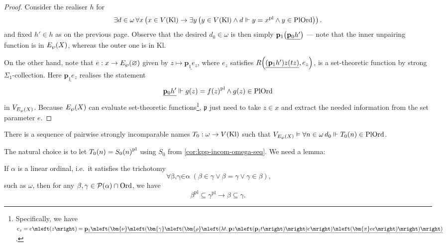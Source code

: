 \documentclass[12pt,openany]{book}
\theoremstyle{plain}
\theoremstyle{definition}
\newcommand\opA[1]{\mathop{\forall #1}}
\newcommand\opE[1]{\mathop{\exists #1}}
\newcommand\oplam[1]{\mathop{\lambda #1.}}
\newcommand\Pow{\mathcal{P}}
\newcommand\IKPP{\mathrm{IKP}\mleft(\Pow\mright)}
\newcommand\Ord{\mathrm{Ord}}
\newcommand\PlOrd{\mathrm{PlOrd}}
\newcommand\Kl{\mathrm{Kl}}
\newcommand\bp{\mathbf{p}}
\newcommand\pl{\mathrm{pl}}
\begin{document}
\begin{proof}
  Consider the realiser $h$ for
  \[\opE{d \in \omega} \opA{x} \left(x \in V\mleft(\Kl\mright) \rightarrow \opE{y} \left(y \in V\mleft(\Kl\mright) \land d \Vdash y = x^\pl \land y \in \PlOrd\right)\right).\]
  and fixed $h' \in h$ as on the previous page. Observe that the desired $d_0 \in \omega$ is then simply $\bp_1 \mleft(\underline{\bp_0 h'}\mright)$ --- note that the inner unpairing function is in $E_\wp\mleft(X\mright)$, whereas the outer one is in $\Kl$.

  On the other hand, note that $e : x \rightarrow E_\wp\mleft(\varnothing\mright)$ given by $z \mapsto \underline{\bp_1 e_z}$, where $e_z$ satisfies $R\mleft(\underline{\mleft(\bp_1 h'\mright) z \mleft(tz\mright)}, e_z\mright)$, is a set-theoretic function by strong $\Sigma_1$-collection. Here $\underline{\bp_1 e_z}$ realises the statement
  \[\underline{\bp_0 h'} \Vdash g\mleft(z\mright) = f\mleft(z\mright)^\pl \land g\mleft(z\mright) \in \PlOrd\]
  in $V_{E_\wp\mleft(X\mright)}$. Because $E_\wp\mleft(X\mright)$ can evaluate set-theoretic functions\footnote{\label{ftn:ep-rec-set-func}Specifically, we have $e_z = e\mleft(z\mright) = \underline{\bp_1 \mleft(\bm{\nu} \mleft(\bm{\gamma} \mleft(\bm{\rho} \mleft(\oplam{t} \bp z \mleft(\bp_1 t\mright)\mright) e\mright) \mleft(\bm{\pi} ee\mright)\mright)\mright)}$.}, $\mathfrak{p}$ just need to take $z \in x$ and extract the needed information from the set parameter $e$.
\end{proof}

\begin{corollary}
  \label{cor:kpp-incom-pl-omega-seq}
  There is a sequence of pairwise strongly incomparable names $T_0 : \omega \rightarrow V\mleft(\Kl\mright)$ such that $V_{E_\wp\mleft(X\mright)} \vDash \opA{n \in \omega} d_0 \Vdash T_0\mleft(n\mright) \in \PlOrd$.
\end{corollary}

The natural choice is to let $T_0\mleft(n\mright) = S_0\mleft(n\mright)^\pl$ using $S_0$ from \autoref{cor:kpp-incom-omega-seq}. We need a lemma:
\begin{lemma}[$\IKPP$]
  \label{lem:lin-ord-pl-pres-incom}
  If $\alpha$ is a linear ordinal, i.e.\ it satisfies the trichotomy
  \[\opA{\beta, \gamma \in \alpha} \left(\beta \in \gamma \lor \beta = \gamma \lor \gamma \in \beta\right),\]
  such as $\omega$, then for any $\beta, \gamma \in \Pow\mleft(\alpha\mright) \cap \Ord$, we have
  \[\beta^\pl \subseteq \gamma^\pl \rightarrow \beta \subseteq \gamma.\]
\end{lemma}
\end{document}
